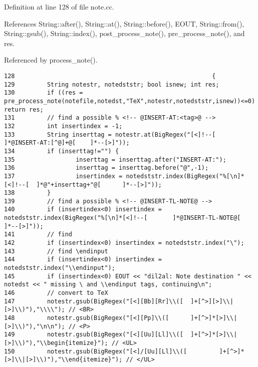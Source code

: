 Definition at line 128 of file note.cc.

References String::after(), String::at(), String::before(), EOUT, String::from(), String::gsub(), String::index(), post\_\-process\_\-note(), pre\_\-process\_\-note(), and res.

Referenced by process\_\-note().



\footnotesize\begin{verbatim}128                                                       {
129         String notestr, notedststr; bool isnew; int res;
130         if ((res = pre_process_note(notefile,notedst,"TeX",notestr,notedststr,isnew))<=0) return res;
131         // find a possible % <!-- @INSERT-AT:<tag>@ -->
132         int insertindex = -1;
133         String inserttag = notestr.at(BigRegex("[<]!--[         ]*@INSERT-AT:[^@]+@[    ]*--[>]"));
134         if (inserttag!="") {
135                 inserttag = inserttag.after("INSERT-AT:");
136                 inserttag = inserttag.before("@",-1);
137                 insertindex = notedststr.index(BigRegex("%[\n]*[<]!--[  ]*@"+inserttag+"@[      ]*--[>]"));
138         }
139         // find a possible % <!-- @INSERT-TL-NOTE@ -->
140         if (insertindex<0) insertindex = notedststr.index(BigRegex("%[\n]*[<]!--[       ]*@INSERT-TL-NOTE@[     ]*--[>]"));
141         // find 
142         if (insertindex<0) insertindex = notedststr.index("\");
143         // find \endinput
144         if (insertindex<0) insertindex = notedststr.index("\\endinput");
145         if (insertindex<0) EOUT << "dil2al: Note destination " << notedst << " missing \ and \\endinput tags, continuing\n";
146         // convert to TeX
147         notestr.gsub(BigRegex("[<][Bb][Rr]\\([  ]+[^>][>]\\|[>]\\)"),"\\\\"); // <BR>
148         notestr.gsub(BigRegex("[<][Pp]\\([      ]+[^>]*[>]\\|[>]\\)"),"\n\n"); // <P>
149         notestr.gsub(BigRegex("[<][Uu][Ll]\\([  ]+[^>]*[>]\\|[>]\\)"),"\\begin{itemize}"); // <UL>
150         notestr.gsub(BigRegex("[<]/[Uu][Ll]\\([         ]+[^>]*[>]\\|[>]\\)"),"\\end{itemize}"); // </UL>

\end{verbatim}
